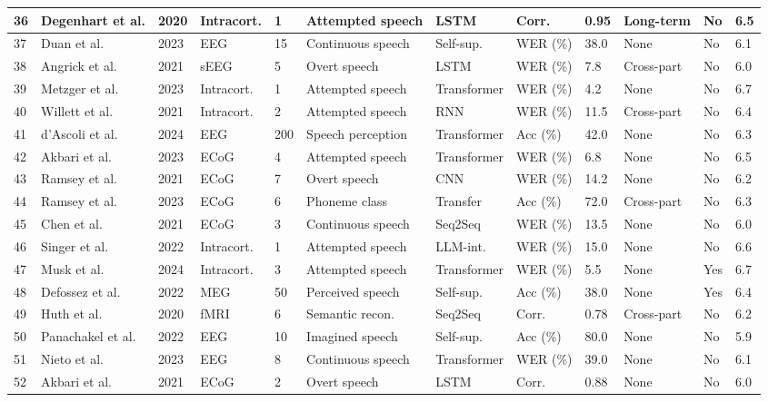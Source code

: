\documentclass[11pt,a4paper]{article}
\begin{document}
{\begin{longtable}{|p{0.6cm}|p{1.8cm}|p{0.5cm}|p{1.2cm}|p{0.6cm}|p{1.0cm}|p{1.0cm}|p{0.8cm}|p{1.0cm}|p{1.0cm}|p{0.6cm}|p{0.6cm}|}
\hline
36 & Degenhart et al. & 2020 & Intracort. & 1 & Attempted speech & LSTM & Corr. & 0.95 & Long-term & No & 6.5 \\
\hline
37 & Duan et al. & 2023 & EEG & 15 & Continuous speech & Self-sup. & WER (\%) & 38.0 & None & No & 6.1 \\
\hline
38 & Angrick et al. & 2021 & sEEG & 5 & Overt speech & LSTM & WER (\%) & 7.8 & Cross-part & No & 6.0 \\
\hline
39 & Metzger et al. & 2023 & Intracort. & 1 & Attempted speech & Transformer & WER (\%) & 4.2 & None & No & 6.7 \\
\hline
40 & Willett et al. & 2021 & Intracort. & 2 & Attempted speech & RNN & WER (\%) & 11.5 & Cross-part & No & 6.4 \\
\hline
41 & d'Ascoli et al. & 2024 & EEG & 200 & Speech perception & Transformer & Acc (\%) & 42.0 & None & No & 6.3 \\
\hline
42 & Akbari et al. & 2023 & ECoG & 4 & Attempted speech & Transformer & WER (\%) & 6.8 & None & No & 6.5 \\
\hline
43 & Ramsey et al. & 2021 & ECoG & 7 & Overt speech & CNN & WER (\%) & 14.2 & None & No & 6.2 \\
\hline
44 & Ramsey et al. & 2023 & ECoG & 6 & Phoneme class & Transfer & Acc (\%) & 72.0 & Cross-part & No & 6.3 \\
\hline
45 & Chen et al. & 2021 & ECoG & 3 & Continuous speech & Seq2Seq & WER (\%) & 13.5 & None & No & 6.0 \\
\hline
46 & Singer et al. & 2022 & Intracort. & 1 & Attempted speech & LLM-int. & WER (\%) & 15.0 & None & No & 6.6 \\
\hline
47 & Musk et al. & 2024 & Intracort. & 3 & Attempted speech & Transformer & WER (\%) & 5.5 & None & Yes & 6.7 \\
\hline
48 & Defossez et al. & 2022 & MEG & 50 & Perceived speech & Self-sup. & Acc (\%) & 38.0 & None & Yes & 6.4 \\
\hline
49 & Huth et al. & 2020 & fMRI & 6 & Semantic recon. & Seq2Seq & Corr. & 0.78 & Cross-part & No & 6.2 \\
\hline
50 & Panachakel et al. & 2022 & EEG & 10 & Imagined speech & Self-sup. & Acc (\%) & 80.0 & None & No & 5.9 \\
\hline
51 & Nieto et al. & 2023 & EEG & 8 & Continuous speech & Transformer & WER (\%) & 39.0 & None & No & 6.1 \\
\hline
52 & Akbari et al. & 2021 & ECoG & 2 & Overt speech & LSTM & Corr. & 0.88 & None & No & 6.0 \\

\end{longtable}}
\end{document}
